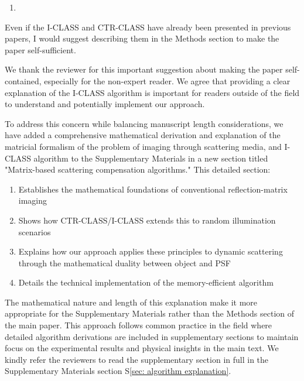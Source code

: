 \documentclass[12pt]{article}
\newenvironment{solved_reviewercomment}
    {\begin{tcolorbox}[width=\linewidth,colback=gray!5,colframe=solved_commentcolor!50,title=Reviewer Comment,left=5pt,right=5pt]}
    {\end{tcolorbox}}
\newenvironment{finished_ourresponse}
    {\begin{tcolorbox}[width=\linewidth,breakable,enhanced,colback=gray!5,colframe=finished_responsecolor!50,title=Response,left=5pt,right=5pt]}
    {\end{tcolorbox}}
\begin{document}
    
\begin{enumerate}[label=\arabic*., resume]
\item \leavevmode
\end{enumerate}
\vspace{-1em}
\begin{solved_reviewercomment}
    Even if the I-CLASS and CTR-CLASS have already been presented in previous papers, I would suggest describing them in the Methods section to make the paper self-sufficient. 
\end{solved_reviewercomment}

\begin{finished_ourresponse}
We thank the reviewer for this important suggestion about making the paper self-contained, especially for the non-expert reader. We agree that providing a clear explanation of the I-CLASS algorithm is important for readers outside of the field to understand and potentially implement our approach.

To address this concern while balancing manuscript length considerations, we have added a comprehensive mathematical derivation and explanation of the matricial formalism of the problem of imaging through scattering media, and I-CLASS algorithm to the Supplementary Materials in a new section titled "Matrix-based scattering compensation algorithms." This detailed section:

\begin{enumerate}
    \item Establishes the mathematical foundations of conventional reflection-matrix imaging
    \item Shows how CTR-CLASS/I-CLASS extends this to random illumination scenarios
    \item Explains how our approach applies these principles to dynamic scattering through the mathematical duality between object and PSF
    \item Details the technical implementation of the memory-efficient algorithm
    \end{enumerate}

The mathematical nature and length of this explanation make it more appropriate for the Supplementary Materials rather than the Methods section of the main paper. This approach follows common practice in the field where detailed algorithm derivations are included in supplementary sections to maintain focus on the experimental results and physical insights in the main text.
We kindly refer the reviewers to read the supplementary section in full in the Supplementary Materials section S\ref{sec: algorithm explanation}.

\end{finished_ourresponse}
\end{document}
